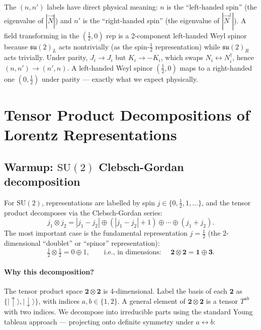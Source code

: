 \begin{physinterp}
  The $(n,n')$ labels have direct physical meaning:
  $n$ is the ``left-handed spin'' (the eigenvalue of $|\vec{N}|$)
  and $n'$ is the ``right-handed spin'' (the eigenvalue of $|\vec{N}^\dagger|$).
  A field transforming in the $(\tfrac{1}{2},0)$ rep is a 2-component left-handed
  Weyl spinor because $\mathfrak{su}(2)_L$ acts nontrivially (as the spin-$\tfrac{1}{2}$
  representation) while $\mathfrak{su}(2)_R$ acts trivially.
  Under parity, $J_i \to J_i$ but $K_i \to -K_i$, which swaps $N_i \leftrightarrow N_i^\dagger$,
  hence $(n,n') \to (n',n)$.
  A left-handed Weyl spinor $(\tfrac{1}{2},0)$ maps to a right-handed one $(0,\tfrac{1}{2})$
  under parity --- exactly what we expect physically.
\end{physinterp}

\section{Tensor Product Decompositions of Lorentz Representations}

\subsection{Warmup: \texorpdfstring{$\mathrm{SU}(2)$}{SU(2)} Clebsch-Gordan decomposition}

For $\mathrm{SU}(2)$, representations are labelled by spin $j \in \{0,\tfrac{1}{2},1,\ldots\}$,
and the tensor product decomposes via the Clebsch-Gordan series:
\begin{equation}
  j_1 \otimes j_2 = |j_1-j_2| \oplus (|j_1-j_2|+1) \oplus \cdots \oplus (j_1+j_2).
  \label{eq:CG}
\end{equation}
The most important case is the fundamental representation $j=\tfrac{1}{2}$
(the 2-dimensional ``doublet'' or ``spinor'' representation):
\begin{equation}
  \tfrac{1}{2} \otimes \tfrac{1}{2}
  = 0 \oplus 1,
  \qquad\text{i.e., in dimensions: }\quad
  \mathbf{2} \otimes \mathbf{2} = \mathbf{1} \oplus \mathbf{3}.
\end{equation}

\paragraph{Why this decomposition?}
The tensor product space $\mathbf{2}\otimes\mathbf{2}$ is 4-dimensional.
Label the basis of each $\mathbf{2}$ as $\{|{\uparrow}\rangle, |{\downarrow}\rangle\}$,
with indices $a,b \in \{1,2\}$.  A general element of $\mathbf{2}\otimes\mathbf{2}$
is a tensor $T^{ab}$ with two indices.  We decompose into irreducible parts using
the standard Young tableau approach --- projecting onto definite symmetry under
$a \leftrightarrow b$:

